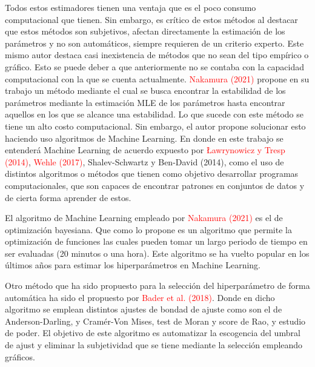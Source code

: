 \par Todos estos estimadores tienen una ventaja que es el poco consumo computacional que 
tienen. Sin embargo,  es cr\'itico de estos m\'etodos al destacar
que estos m\'etodos son subjetivos, afectan directamente la estimaci\'on de los par\'ametros y
no son autom\'aticos, siempre requieren de un criterio experto.
Este mismo autor destaca casi inexistencia de m\'etodos que no sean del tipo emp\'irico o gr\'afico.
Esto se puede deber a que anteriormente no se contaba con la capacidad computacional con la que
se cuenta actualmente. \textcolor{red}{Nakamura (2021)} propone en su trabajo un m\'etodo mediante
el cual se busca encontrar la estabilidad de los par\'ametros mediante la estimaci\'on MLE de los
par\'ametros hasta encontrar aquellos en los que se alcance una estabilidad.
Lo que sucede con este m\'etodo se tiene un alto costo computacional. Sin embargo, el autor
propone solucionar esto haciendo uso algoritmos de Machine Learning. En donde en este trabajo
se entender\'a Machine Learning de acuerdo expuesto por \textcolor{red}{Ławrynowicz y Tresp (2014)},
\textcolor{red}{Wehle (2017)}, Shalev-Schwartz y Ben-David (2014), como el uso de
distintos algoritmos o métodos que tienen como objetivo desarrollar programas computacionales, 
que son capaces de encontrar patrones en conjuntos de datos y de cierta forma aprender de estos.

\par El algoritmo de Machine Learning empleado por \textcolor{red}{Nakamura (2021)} es el de optimizaci\'on
bayesiana. Que como lo propone \textcolor{Frazier (2018)} es un algoritmo que permite la optimizaci\'on 
de funciones las cuales pueden tomar un largo periodo de tiempo en ser evaluadas (20 minutos o una hora).
Este algoritmo se ha vuelto popular en los \'ultimos a\~nos para estimar los hiperpar\'ametros en Machine Learning.

\par Otro m\'etodo que ha sido propuesto para la selecci\'on del hiperpar\'ametro de
forma autom\'atica ha sido el propuesto por \textcolor{red}{Bader et al. (2018)}. Donde en
dicho algoritmo se emplean distintos ajustes de bondad de ajuste como son el de Anderson-Darling,
y Cram\'er-Von Mises, test de Moran y score de Rao, y estudio de poder. El objetivo de este algoritmo
es automatizar la escogencia del umbral de ajust y eliminar la subjetividad que se tiene mediante
la selecci\'on empleando gr\'aficos.